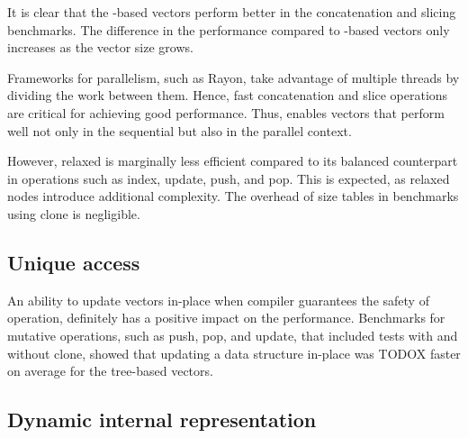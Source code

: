 It is clear that the \rrbtree{}-based vectors perform better in the concatenation and slicing benchmarks. The difference in the performance compared to \rbtree{}-based vectors only increases as the vector size grows. 

Frameworks for parallelism, such as Rayon, take advantage of multiple threads by dividing the work between them. Hence, fast concatenation and slice operations are critical for achieving good performance. Thus, \rrbtree{} enables vectors that perform well not only in the sequential but also in the parallel context. 

However, relaxed \rbtree{} is marginally less efficient compared to its balanced counterpart in operations such as index, update, push, and pop. This is expected, as relaxed nodes introduce additional complexity. The overhead of size tables in benchmarks using clone is negligible. 

\subsection{Unique access}

An ability to update vectors in-place when compiler guarantees the safety of operation, definitely has a positive impact on the performance. Benchmarks for mutative operations, such as push, pop, and update, that included tests with and without clone, showed that updating a data structure in-place was TODOX faster on average for the tree-based vectors. 



\subsection{Dynamic internal representation}

